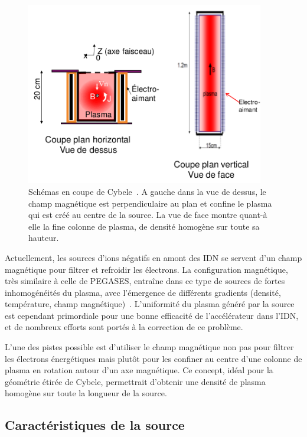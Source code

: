 \begin{refsection}
\begin{figure}[!htbp]
  \centering
    \includegraphics[height=8cm]{figures/4-cybeleSchema.png}
    \caption{Schémas en coupe de Cybele~\parencite{SimoninHDR}. A gauche dans la
vue de dessus, le champ magnétique est perpendiculaire au plan et confine le
plasma qui est créé au centre de la source. La vue de face montre quant-à elle
la fine colonne de plasma, de densité homogène sur toute sa hauteur.
\label{4-cybeleSchema}}
\end{figure}	

Actuellement, les sources d'ions négatifs en amont des IDN se servent d'un champ
magnétique pour filtrer et refroidir les électrons. La configuration magnétique,
très similaire à celle de PEGASES, entraîne dans ce type de sources de fortes
inhomogénéités du plasma, avec l'émergence de différents gradients
(densité, température, champ magnétique)~\parencite{Fantz,Kolev}. L'uniformité
du plasma généré par la source est cependant primordiale pour une bonne efficacité de l'accélérateur
dans l'IDN, et de nombreux efforts sont portés à la correction de ce problème.

L'une des pistes possible est d'utiliser le champ magnétique non pas pour
filtrer les électrons énergétiques mais plutôt pour les confiner au centre
d'une colonne de plasma en rotation autour d'un axe magnétique. Ce concept,
idéal pour la géométrie étirée de Cybele, permettrait d'obtenir une densité de
plasma homogène sur toute la longueur de la source. 

\subsection{Caractéristiques de la source}


\end{refsection}
